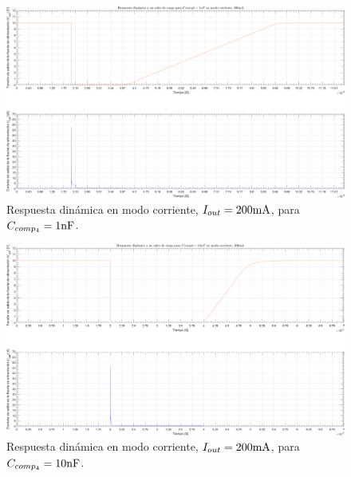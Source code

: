 \clearpage

\begin{figure}[H] %
\begin{center}
\includegraphics[width=1.1 \textwidth, angle=90]{./img/plots/dynamic/power_supply_CCOMP4_1n_STEP_Modo4.png}
\caption{\label{fig:fig_power_supply_CCOMP4_STEP_1n_Modo4}\footnotesize{Respuesta dinámica en modo corriente, $I_{out} = 200 \si[per-mode=symbol]{\milli\ampere}$, para $C_{comp_{4}} = 1 \si[per-mode=symbol]{\nano\farad} $.}}
\end{center}
\end{figure}

\clearpage

\begin{figure}[H] %
\begin{center}
\includegraphics[width=1.1 \textwidth, angle=90]{./img/plots/dynamic/power_supply_CCOMP4_10n_STEP_Modo4.png}
\caption{\label{fig:fig_power_supply_CCOMP4_STEP_10n_Modo4}\footnotesize{Respuesta dinámica en modo corriente, $I_{out} = 200 \si[per-mode=symbol]{\milli\ampere}$, para $C_{comp_{4}} = 10 \si[per-mode=symbol]{\nano\farad} $.}}
\end{center}
\end{figure}

